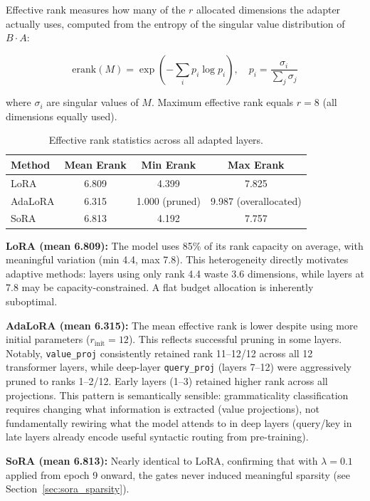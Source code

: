 \documentclass[12pt,a4paper]{article}
\theoremstyle{definition}
\begin{document}
Effective rank measures how many of the $r$ allocated dimensions the adapter actually uses, computed from the entropy of the singular value distribution of $B \cdot A$:

\begin{equation}
\text{erank}(M) = \exp\!\left(-\sum_i p_i \log p_i\right), \quad p_i = \frac{\sigma_i}{\sum_j \sigma_j}
\end{equation}

where $\sigma_i$ are singular values of $M$. Maximum effective rank equals $r=8$ (all dimensions equally used).

\begin{table}[H]
\centering
\caption{Effective rank statistics across all adapted layers.}
\label{tab:erank}
\begin{tabular}{lccc}
\toprule
\textbf{Method} & \textbf{Mean Erank} & \textbf{Min Erank} & \textbf{Max Erank} \\
\midrule
LoRA   & 6.809 & 4.399 & 7.825 \\
AdaLoRA & 6.315 & 1.000 (pruned) & 9.987 (overallocated) \\
SoRA   & 6.813 & 4.192 & 7.757 \\
\bottomrule
\end{tabular}
\end{table}

\textbf{LoRA (mean 6.809):} The model uses 85\% of its rank capacity on average, with meaningful variation (min 4.4, max 7.8). This heterogeneity directly motivates adaptive methods: layers using only rank 4.4 waste 3.6 dimensions, while layers at 7.8 may be capacity-constrained. A flat budget allocation is inherently suboptimal.

\textbf{AdaLoRA (mean 6.315):} The mean effective rank is lower despite using more initial parameters ($r_{\text{init}}=12$). This reflects successful pruning in some layers. Notably, \texttt{value\_proj} consistently retained rank 11--12/12 across all 12 transformer layers, while deep-layer \texttt{query\_proj} (layers 7--12) were aggressively pruned to ranks 1--2/12. Early layers (1--3) retained higher rank across all projections. This pattern is semantically sensible: grammaticality classification requires changing what information is extracted (value projections), not fundamentally rewiring what the model attends to in deep layers (query/key in late layers already encode useful syntactic routing from pre-training).

\textbf{SoRA (mean 6.813):} Nearly identical to LoRA, confirming that with $\lambda=0.1$ applied from epoch 9 onward, the gates never induced meaningful sparsity (see Section~\ref{sec:sora_sparsity}).
\end{document}
